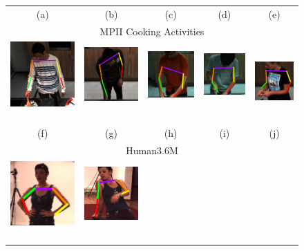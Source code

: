\documentclass[runningheads]{llncs}
\begin{document}
\begin{figure}[t]
\begin{center}
\begin{tabular}{@{}c@{}c c@{}c@{}c@{}}
(a) & (b) & (c) & (d) & (e)\\[0.6em]
\multicolumn{5}{c}{MPII Cooking Activities}\\
\includegraphics[width=0.17\linewidth]{figures/shots-cropped/mpii-s10f54-good-white-shirt.jpg}\,&
\includegraphics[width=0.17\linewidth]{figures/shots-cropped/mpii-s8f38-good-open-draw.jpg}\,&
\includegraphics[width=0.17\linewidth]{figures/shots-cropped/mpii-s2f10-bad-shoulders.jpg}\,&
\includegraphics[width=0.17\linewidth]{figures/shots-cropped/mpii-s5f52-bad-shoulders.jpg}\,&
\includegraphics[width=0.17\linewidth]{figures/shots-cropped/mpii-s14f21-bad-forearm.jpg}\\
(f) & (g) & (h) & (i) & (j)\\[0.6em]
\multicolumn{5}{c}{Human3.6M}\\
\includegraphics[width=0.17\linewidth]{figures/shots-cropped/h36m-s28f2-good-teapot.jpg}\,&
\includegraphics[width=0.17\linewidth]{figures/shots-cropped/h36m-s31f12-good-chair.jpg}\,&

\end{tabular}
\end{center}
\end{figure}
\end{document}
